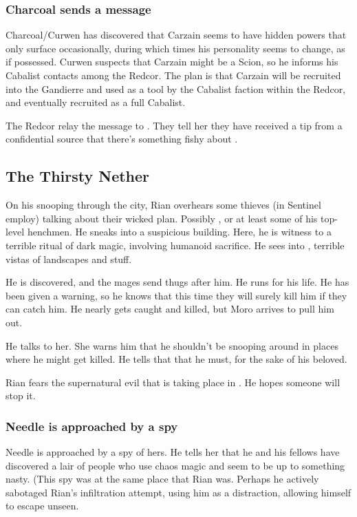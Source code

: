 \subsubsection{Charcoal sends a message}
Charcoal/Curwen has discovered that Carzain seems to have hidden powers that only surface occasionally, during which times his personality seems to change, as if possessed. Curwen suspects that Carzain might be a Scion, so he informs his Cabalist contacts among the Redcor. The plan is that Carzain will be recruited into the Gandierre and used as a tool by the Cabalist faction within the Redcor, and eventually recruited as a full Cabalist. 

The Redcor relay the message to \Esmerel. 
They tell her they have received a tip from a confidential source that there's something fishy about \Shireyo. 








\subsection{The Thirsty Nether}
On his snooping through the city, Rian overhears some thieves (in Sentinel employ) talking about their wicked plan. 
Possibly \Psyrex{}, or at least some of his top-level henchmen. 
He sneaks into a suspicious building. 
Here, he is witness to a terrible ritual of dark magic, involving humanoid sacrifice. 
He sees into \Machai, terrible vistas of \daemonic{} landscapes and stuff. 

He is discovered, and the mages send thugs after him. 
He runs for his life. 
He has been given a warning, so he knows that this time they will surely kill him if they can catch him. 
He nearly gets caught and killed, but Moro \Cobrel{} arrives to pull him out. 

He talks to her. She warns him that he shouldn't be snooping around in places where he might get killed. He tells that that he must, for the sake of his beloved. 

Rian fears the supernatural evil that is taking place in \Malcur. 
He hopes someone will stop it. 





\subsubsection{Needle is approached by a spy}
Needle is approached by a spy of hers. He tells her that he and his fellows have discovered a lair of people who use chaos magic and seem to be up to something nasty. (This spy was at the same place that Rian was. Perhaps he actively sabotaged Rian's infiltration attempt, using him as a distraction, allowing himself to escape unseen. 

